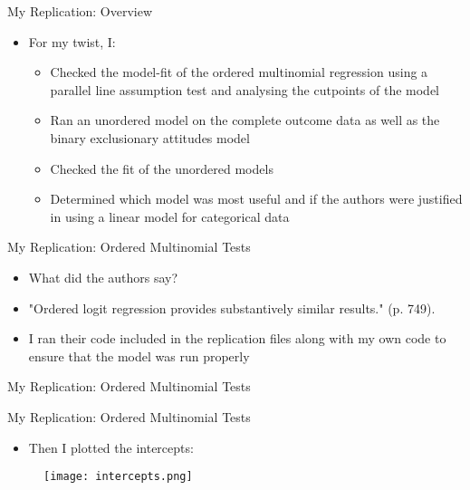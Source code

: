 \documentclass{beamer}
\begin{document}
\begin{frame}{My Replication: Overview}
	\begin{itemize}
	\item For my twist, I:
		\begin{itemize}
			\item Checked the model-fit of the ordered multinomial regression using a parallel line assumption test and analysing the cutpoints of the model
			\item Ran an unordered model on the complete outcome data as well as the binary exclusionary attitudes model
			\item Checked the fit of the unordered models
			\item Determined which model was most useful and if the authors were justified in using a linear model for categorical data
		\end{itemize}
	\end{itemize}
\end{frame}


\begin{frame}{My Replication: Ordered Multinomial Tests}
	\begin{itemize}
		\item What did the authors say?
		\item "Ordered logit regression provides substantively similar results." (p. 749).
		\item I ran their code included in the replication files along with my own code to ensure that the model was run properly
	\end{itemize}
\end{frame}

\begin{frame}{My Replication: Ordered Multinomial Tests}
	   \begin{center}
	   	\vspace{-1cm}
		\end{center}
\end{frame}

\begin{frame}{My Replication: Ordered Multinomial Tests}
	\begin{itemize}
		\item Then I plotted the intercepts:
	\end{itemize}
	\begin{figure}[htbp]
		\centering
		\texttt{[image: intercepts.png]} %
		\label{fig:intercepts}
	\end{figure}
\end{frame}
\end{document}
